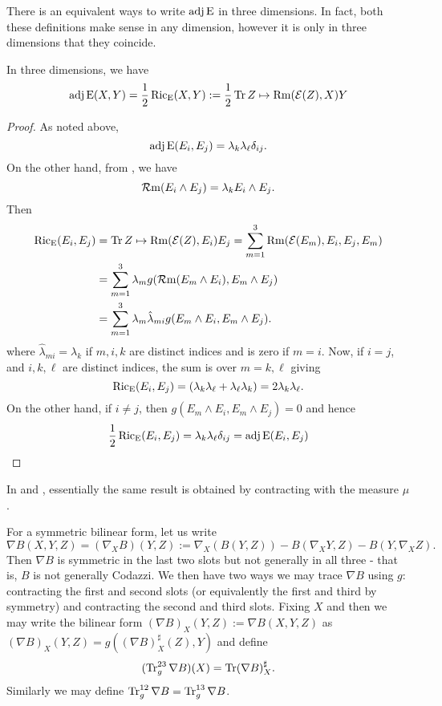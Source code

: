 \documentclass[a4paper, 12pt]{amsart}
\begin{document}
There is an equivalent ways to write \(\operatorname{adj}\operatorname{E}\) in three dimensions. In fact, both these definitions make sense in any dimension, however it is only in three dimensions that they coincide.
\begin{lemma}
\label{eq:xcf_equiv}
In three dimensions, we have
\[
\operatorname{adj}\operatorname{E}(X, Y) = \frac{1}{2} \operatorname{Ric}_{\operatorname{E}} (X, Y) := \frac{1}{2} \operatorname{Tr} Z \mapsto \operatorname{Rm}(\operatorname{\mathcal{E}}(Z), X) Y
\]
\end{lemma}
\begin{proof}
As noted above,
\[
\operatorname{adj}\operatorname{E}(E_i, E_j) = \lambda_k \lambda_{\ell} \delta_{ij}.
\]
On the other hand, from , we have
\[
\operatorname{\mathcal{R}m}(E_i \wedge E_j) = \lambda_k E_i \wedge E_j.
\]
Then
\[
\begin{split}
\operatorname{Ric}_{\operatorname{E}}(E_i, E_j) &= \operatorname{Tr} Z \mapsto \operatorname{Rm}(\operatorname{\mathcal{E}}(Z), E_i) E_j = \sum_{m=1}^3 \operatorname{Rm}(\operatorname{\mathcal{E}}(E_m), E_i, E_j, E_m) \\
&= \sum_{m=1}^3 \lambda_m g(\operatorname{\mathcal{R}m}(E_m \wedge E_i), E_m \wedge E_j) \\
&= \sum_{m=1}^3 \lambda_m \hat{\lambda}_{mi} g(E_m \wedge E_i, E_m \wedge E_j).
\end{split}
\]
where \(\hat{\lambda}_{mi} = \lambda_k\) if \(m,i,k\) are distinct indices and is zero if \(m=i\). Now, if \(i = j\), and \(i, k, \ell\) are distinct indices, the sum is over \(m=k, \ell\) giving
\[
\operatorname{Ric}_{\operatorname{E}}(E_i, E_j) = \left(\lambda_k \lambda_{\ell} + \lambda_{\ell} \lambda_k\right) = 2\lambda_k \lambda_{\ell}.
\]
On the other hand, if \(i \ne j\), then \(g(E_m \wedge E_i, E_m \wedge E_j) = 0\) and hence
\[
\frac{1}{2} \operatorname{Ric}_{\operatorname{E}}(E_i, E_j) =  \lambda_k \lambda_{\ell} \delta_{ij} = \operatorname{adj}\operatorname{E}(E_i, E_j)
\]
\end{proof}
\begin{rem}
In \cite[Lemma 3]{MR2055396} and \cite[Equation (3)]{MR2207496}, essentially the same result is obtained by contracting with the measure \(\mu\).
\end{rem}

For a symmetric bilinear form, let us write
\[
\nabla B (X, Y, Z) = (\nabla_X B) (Y, Z) := \nabla_X (B(Y, Z)) - B(\nabla_X Y, Z) - B(Y, \nabla_X Z).
\]
Then \(\nabla B\) is symmetric in the last two slots but not generally in all three - that is, \(B\) is not generally Codazzi. We then have two ways we may trace \(\nabla B\) using \(g\): contracting the first and second slots (or equivalently the first and third by symmetry) and contracting the second and third slots. Fixing \(X\) and then we may write the bilinear form \((\nabla B)_X (Y, Z) := \nabla B (X, Y, Z)\) as \((\nabla B)_X (Y, Z) = g((\nabla B)^{\sharp}_X (Z), Y)\) and define
\[
(\operatorname{Tr}_g^{23} \nabla B) (X) = \operatorname{Tr} (\nabla B)^{\sharp}_X.
\]
Similarly we may define \(\operatorname{Tr}_g^{12} \nabla B = \operatorname{Tr}_g^{13} \nabla B\).
\end{document}
